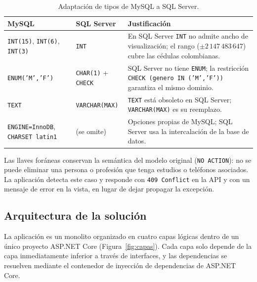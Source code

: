 \documentclass[12pt,letterpaper]{article}
\begin{document}
\begin{table}[H]
\centering
\caption{Adaptación de tipos de MySQL a SQL Server.}
\label{tab:tipos}
\begin{tabularx}{\textwidth}{l l X}
\toprule
\textbf{MySQL} & \textbf{SQL Server} & \textbf{Justificación} \\
\midrule
\texttt{INT(15)}, \texttt{INT(6)}, \texttt{INT(3)} & \texttt{INT} &
  En SQL Server \texttt{INT} no admite ancho de visualización; el rango
  ($\pm 2\,147\,483\,647$) cubre las cédulas colombianas. \\
\texttt{ENUM('M','F')} & \texttt{CHAR(1)} + \texttt{CHECK} &
  SQL Server no tiene \texttt{ENUM}; la restricción \texttt{CHECK (genero IN ('M','F'))}
  garantiza el mismo dominio. \\
\texttt{TEXT} & \texttt{VARCHAR(MAX)} &
  \texttt{TEXT} está obsoleto en SQL Server; \texttt{VARCHAR(MAX)} es su reemplazo. \\
\texttt{ENGINE=InnoDB}, \texttt{CHARSET latin1} & (se omite) &
  Opciones propias de MySQL; SQL Server usa la intercalación de la base de datos. \\
\bottomrule
\end{tabularx}
\end{table}

Las llaves foráneas conservan la semántica del modelo original (\texttt{NO ACTION}): no
se puede eliminar una persona o profesión que tenga estudios o teléfonos asociados. La
aplicación detecta este caso y responde con \texttt{409 Conflict} en la API y con un
mensaje de error en la vista, en lugar de dejar propagar la excepción.

\subsection{Arquitectura de la solución}

La aplicación es un monolito organizado en cuatro capas lógicas dentro de un único
proyecto ASP.NET Core (Figura~\ref{fig:capas}). Cada capa solo depende de la capa
inmediatamente inferior a través de interfaces, y las dependencias se resuelven mediante el
contenedor de inyección de dependencias de ASP.NET Core.
\end{document}
